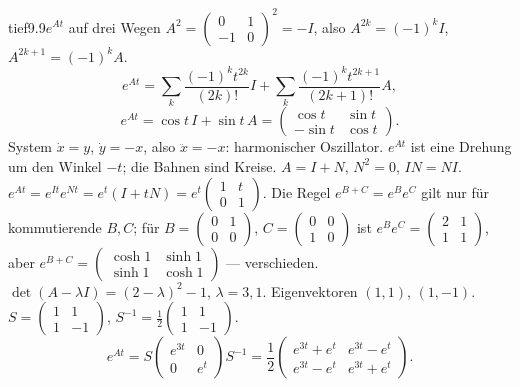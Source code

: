 \begin{loesungkarte}{tief}{9.9}{$e^{At}$ auf drei Wegen}
$A^{2} = \begin{pmatrix}0&1\\-1&0\end{pmatrix}^{2} = -I$, also $A^{2k} = (-1)^{k}I$, $A^{2k+1} = (-1)^{k}A$.
\[ e^{At} = \sum_k\frac{(-1)^{k}t^{2k}}{(2k)!}I + \sum_k\frac{(-1)^{k}t^{2k+1}}{(2k + 1)!}A, \]
\[ e^{At} = \cos t\,I + \sin t\,A = \begin{pmatrix}\cos t&\sin t\\-\sin t&\cos t\end{pmatrix}. \]
System $\dot x = y$, $\dot y = -x$, also $\ddot x = -x$: harmonischer Oszillator. $e^{At}$ ist eine Drehung um den Winkel $-t$; die Bahnen sind Kreise.
$A = I + N$, $N^{2} = 0$, $IN = NI$. $e^{At} = e^{It}e^{Nt} = e^{t}(I + tN) = e^{t}\begin{pmatrix}1&t\\0&1\end{pmatrix}$. Die Regel $e^{B + C} = e^{B}e^{C}$ gilt nur für kommutierende $B, C$; für $B = \begin{pmatrix}0&1\\0&0\end{pmatrix}$, $C = \begin{pmatrix}0&0\\1&0\end{pmatrix}$ ist $e^{B}e^{C} = \begin{pmatrix}2&1\\1&1\end{pmatrix}$, aber $e^{B + C} = \begin{pmatrix}\cosh1&\sinh1\\\sinh1&\cosh1\end{pmatrix}$ --- verschieden.
$\det(A - \lambda I) = (2 - \lambda)^{2} - 1$, $\lambda = 3, 1$. Eigenvektoren $(1, 1)$, $(1, -1)$. $S = \begin{pmatrix}1&1\\1&-1\end{pmatrix}$, $S^{-1} = \frac12\begin{pmatrix}1&1\\1&-1\end{pmatrix}$.
\[ e^{At} = S\begin{pmatrix}e^{3t}&0\\0&e^{t}\end{pmatrix}S^{-1} = \frac12\begin{pmatrix}e^{3t} + e^{t}&e^{3t} - e^{t}\\e^{3t} - e^{t}&e^{3t} + e^{t}\end{pmatrix}. \]

\end{loesungkarte}
